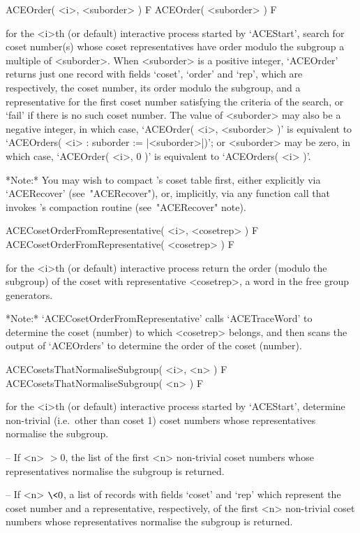 \>ACEOrder( <i>, <suborder> ) F
\>ACEOrder( <suborder> ) F

for the <i>th (or  default)  interactive  {\ACE}  process  started  by
`ACEStart', search for coset  number(s)  whose  coset  representatives
have  order  modulo  the  subgroup  a  multiple  of  <suborder>.  When
<suborder> is a positive integer, `ACEOrder' returns just  one  record
with fields `coset', `order' and `rep', which  are  respectively,  the
coset number, its order modulo the subgroup, and a representative  for
the first coset number satisfying  the  criteria  of  the  search,  or
`fail' if there is no such coset number. The value of  <suborder>  may
also be a negative integer, in which case, `ACEOrder( <i>,  <suborder>
)' is equivalent to `ACEOrders( <i> : suborder :=  |<suborder>|)';  or
<suborder> may be zero,  in  which  case,  `ACEOrder(  <i>,  0  )'  is
equivalent to `ACEOrders( <i> )'.

*Note:*
You may wish to compact {\ACE}'s coset table first, either  explicitly
via `ACERecover' (see~"ACERecover"), or, implicitly, via any  function
call that invokes {\ACE}'s compaction routine (see~"ACERecover" note).

\>ACECosetOrderFromRepresentative( <i>, <cosetrep> ) F
\>ACECosetOrderFromRepresentative( <cosetrep> ) F

for the <i>th (or default) interactive {\ACE} process return the order
(modulo the subgroup) of the coset with representative  <cosetrep>,  a
word in the free group generators.

*Note:*   
`ACECosetOrderFromRepresentative' calls  `ACETraceWord'  to  determine
the coset (number) to which <cosetrep> belongs,  and  then  scans  the
output of `ACEOrders' to determine the order of the coset (number).

\>ACECosetsThatNormaliseSubgroup( <i>, <n> ) F
\>ACECosetsThatNormaliseSubgroup( <n> ) F

for the <i>th (or  default)  interactive  {\ACE}  process  started  by
`ACEStart', determine non-trivial  (i.e.~other  than  coset  1)  coset
numbers whose representatives normalise the subgroup.

\beginlist

\item{--} If <n> $> 0$, the list of the first  <n>  non-trivial  coset
numbers whose representatives normalise the subgroup is returned.

\item{--} If <n> $\< 0$, a list of records  with  fields  `coset'  and
`rep'  which  represent  the  coset  number  and   a   representative,
respectively,  of  the  first  <n>  non-trivial  coset  numbers  whose
representatives normalise the subgroup is returned.

